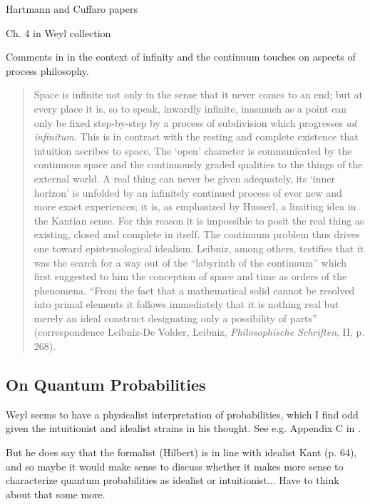 Hartmann and Cuffaro papers

Ch. 4 in Weyl collection 

Comments in \cite{Weyl1949} in the context of infinity and the continuum touches on aspects of process philosophy.

\begin{quote}
    Space is infinite not only in the sense that it never comes to an end; but at every place it is, so to speak, inwardly infinite, inasmuch as a point can only be fixed step-by-step by a process of subdivision which progresses \emph{ad infinitum.}  This is in contrast with the resting and complete existence that intuition ascribes to space.  The `open' character is communicated by the continuous space and the continuously graded qualities to the things of the external world.  A real thing can never be given adequately, its `inner horizon' is unfolded by an infinitely continued process of ever new and more exact experiences; it is, as emphasized by Husserl, a limiting idea in the Kantian sense.  For this reason it is impossible to posit the real thing as existing, closed and complete in itself.  The continuum problem thus drives one toward epistemological idealism.  Leibniz, among others, testifies that it was the search for a way out of the ``labyrinth of the continuum'' which first suggested to him the conception of space and time as orders of the phenomena.  ``From the fact that a mathematical solid cannot be resolved into primal elements it follows immediately that it is nothing real but merely an ideal construct designating only a possibility of parts'' (correspondence Leibniz-De Volder, Leibniz, \emph{Philosophische Schriften}, II, p. 268).

    \citep[p. 41]{Weyl1949}
\end{quote}


\subsection{On Quantum Probabilities}

Weyl seems to have a physicalist interpretation of probabilities, which I find odd given the intuitionist and idealist strains in his thought.  See e.g. Appendix C in \citep{Weyl1949}.

But he does say that the formalist (Hilbert) is in line with idealist Kant (p.  64), and so maybe it would make sense to  discuss whether it makes more sense to characterize quantum probabilities as idealist or intuitionist... Have to think about that some more.

